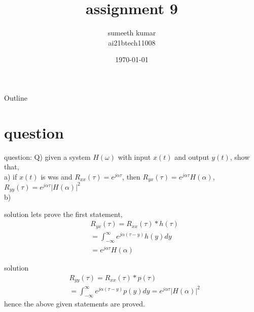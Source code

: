 \documentclass{beamer}
\title{assignment 9}
\author{sumeeth kumar\\ ai21btech11008}
\date{\today}
\begin{document}
\begin{frame}
    \titlepage 
\end{frame}

\logo{}


\begin{frame}{Outline}
    \tableofcontents
\end{frame}


\section{question}
\begin{frame}{question:}
Q) given a system $H(\omega)$ with input $x(t)$ and output $y(t)$, show that,\\
a) if $x(t)$ is wss and $R_{xx}(\tau)=e^{j\alpha\tau}$, then $R_{yx}(\tau)=e^{j\alpha\tau}H(\alpha)$,\\$R_{yy}(\tau)=e^{j\alpha\tau}|H(\alpha)|^2$\\b)



\end{frame}


\begin{frame}{solution} lets prove the first statement,
\begin{align}
    &{R_{yx}(\tau)=R_{xx}(\tau)*h(\tau)}\\[8pt]
    &{=\int_{-\infty}^{\infty}e^{j\alpha(\tau - y)}h(y)dy}\\[8pt]
    &{=e^{j\alpha\tau}H(\alpha)}
    \end{align}
    \end{frame}


\begin{frame}{solution}
\begin{align}
    &{R_{yy}(\tau)=R_{xx}(\tau)*p(\tau)}\\[8pt]
    &{=\int_{-\infty}^{\infty}e^{j\alpha(\tau -y)}p(y)dy=e^{j\alpha\tau}|H(\alpha)|^2}
\end{align}
 hence the above  given statements are proved.   
\end{frame}
\end{document}
